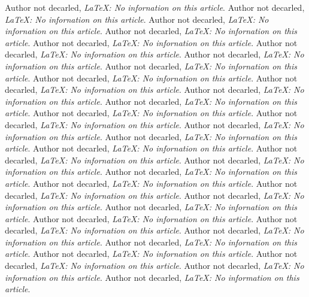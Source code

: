 \documentclass[onecolumn,12pt]{article}
\begin{document}
\begin{thebibliography}{999}
Author not decarled,
\emph{\LaTeX: No infornation on this article}.
Author not decarled,
\emph{\LaTeX: No infornation on this article}.
Author not decarled,
\emph{\LaTeX: No infornation on this article}.
Author not decarled,
\emph{\LaTeX: No infornation on this article}.
Author not decarled,
\emph{\LaTeX: No infornation on this article}.
Author not decarled,
\emph{\LaTeX: No infornation on this article}.
Author not decarled,
\emph{\LaTeX: No infornation on this article}.
Author not decarled,
\emph{\LaTeX: No infornation on this article}.
Author not decarled,
\emph{\LaTeX: No infornation on this article}.
Author not decarled,
\emph{\LaTeX: No infornation on this article}.
Author not decarled,
\emph{\LaTeX: No infornation on this article}.
Author not decarled,
\emph{\LaTeX: No infornation on this article}.
Author not decarled,
\emph{\LaTeX: No infornation on this article}.
Author not decarled,
\emph{\LaTeX: No infornation on this article}.
Author not decarled,
\emph{\LaTeX: No infornation on this article}.
Author not decarled,
\emph{\LaTeX: No infornation on this article}.
Author not decarled,
\emph{\LaTeX: No infornation on this article}.
Author not decarled,
\emph{\LaTeX: No infornation on this article}.
Author not decarled,
\emph{\LaTeX: No infornation on this article}.
Author not decarled,
\emph{\LaTeX: No infornation on this article}.
Author not decarled,
\emph{\LaTeX: No infornation on this article}.
Author not decarled,
\emph{\LaTeX: No infornation on this article}.
Author not decarled,
\emph{\LaTeX: No infornation on this article}.
Author not decarled,
\emph{\LaTeX: No infornation on this article}.
Author not decarled,
\emph{\LaTeX: No infornation on this article}.
Author not decarled,
\emph{\LaTeX: No infornation on this article}.
Author not decarled,
\emph{\LaTeX: No infornation on this article}.
Author not decarled,
\emph{\LaTeX: No infornation on this article}.
Author not decarled,
\emph{\LaTeX: No infornation on this article}.
Author not decarled,
\emph{\LaTeX: No infornation on this article}.
Author not decarled,
\emph{\LaTeX: No infornation on this article}.
Author not decarled,
\emph{\LaTeX: No information on this article}.
\end{thebibliography}
\end{document}
